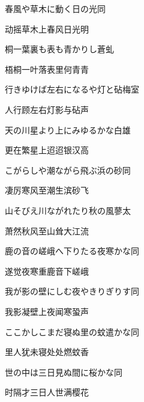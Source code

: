 \begin{haiku}
    {\FH 春風や草木に動く日の光}\hfill{\FH 同}

    {\FK 动摇草木上春风日光明}
\end{haiku}

\begin{haiku}
    {\FH 桐一葉裏も表も青かりし}\hfill{\FH 蒼虬}

    {\FK 梧桐一叶落表里何青青}
\end{haiku}

\begin{haiku}
    {\FH 行きゆけば左右になるや灯と砧}\hfill{\FH 梅室}

    {\FK 人行顾左右灯影与砧声}
\end{haiku}

\begin{haiku}
    {\FH 天の川星より上にみゆるかな}\hfill{\FH 白雄}

    {\FK 更在繁星上迢迢银汉高}
\end{haiku}

\begin{haiku}
    {\FH こがらしや潮ながら飛ぶ浜の砂}\hfill{\FH 同}

    {\FK 凄厉寒风至潮生滨砂飞}
\end{haiku}

\begin{haiku}
    {\FH 山そびえ川ながれたり秋の風}\hfill{\FH 蓼太}

    {\FK 萧然秋风至山耸大江流}
\end{haiku}

\begin{haiku}
    {\FH 鹿の音の嵯峨へ下りたる夜寒かな}\hfill{\FH 同}

    {\FK 遂觉夜寒重鹿音下嵯峨}
\end{haiku}

\begin{haiku}
    {\FH 我が影の壁にしむ夜やきりぎりす}\hfill{\FH 同}

    {\FK 我影凝壁上夜闻寒蛩声}
\end{haiku}

\begin{haiku}
    {\FH ここかしこまだ寝ぬ里の蚊遣かな}\hfill{\FH 同}

    {\FK 里人犹未寝处处燃蚊香}
\end{haiku}

\begin{haiku}
    {\FH 世の中は三日見ぬ間に桜かな}\hfill{\FH 同}

    {\FK 时隔才三日人世满樱花}
\end{haiku}

